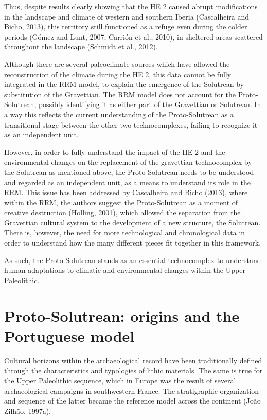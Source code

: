 \documentclass[12pt,twoside]{reedthesis}
\begin{document}
Thus, despite results clearly showing that the HE 2 caused abrupt modifications in the landscape and climate of western and southern Iberia (Cascalheira and Bicho, 2013), this territory still functioned as a refuge even during the colder periods (Gómez and Lunt, 2007; Carrión et al., 2010), in sheltered areas scattered throughout the landscape (Schmidt et al., 2012).

Although there are several paleoclimate sources which have allowed the reconstruction of the climate during the HE 2, this data cannot be fully integrated in the RRM model, to explain the emergence of the Solutrean by substitution of the Gravettian. The RRM model does not account for the Proto-Solutrean, possibly identifying it as either part of the Gravettian or Solutrean. In a way this reflects the current understanding of the Proto-Solutrean as a transitional stage between the other two technocomplexes, failing to recognize it as an independent unit.

However, in order to fully understand the impact of the HE 2 and the environmental changes on the replacement of the gravettian technocomplex by the Solutrean as mentioned above, the Proto-Solutrean needs to be understood and regarded as an independent unit, as a means to understand its role in the RRM. This issue has been addressed by Cascalheira and Bicho (2013), where within the RRM, the authors suggest the Proto-Solutrean as a moment of creative destruction (Holling, 2001), which allowed the separation from the Gravettian cultural system to the development of a new structure, the Solutrean. There is, however, the need for more technological and chronological data in order to understand how the many different pieces fit together in this framework.

As such, the Proto-Solutrean stands as an essential technocomplex to understand human adaptations to climatic and environmental changes within the Upper Paleolithic.

\hypertarget{proto-solutrean-origins-and-the-portuguese-model}{%
\section{Proto-Solutrean: origins and the Portuguese model}\label{proto-solutrean-origins-and-the-portuguese-model}}

Cultural horizons within the archaeological record have been traditionally defined through the characteristics and typologies of lithic materials. The same is true for the Upper Paleolithic sequence, which in Europe was the result of several archaeological campaigns in southwestern France. The stratigraphic organization and sequence of the latter became the reference model across the continent (João Zilhão, 1997a).
\end{document}
